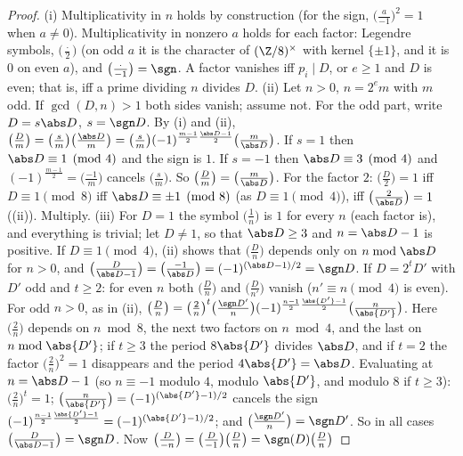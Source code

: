 \begin{proof}
(i) Multiplicativity in $n$ holds by construction (for the sign, $\bigl(\frac a{-1}\bigr)^2=1$ when $a\ne0$). Multiplicativity in nonzero $a$ holds for each factor:
Legendre symbols, $\bigl(\frac\cdot2\bigr)$ (on odd $a$ it is the character of $(\Z/8)^\times$ with kernel $\{\pm1\}$, and it is $0$ on even $a$), and $\bigl(\frac\cdot{-1}\bigr)=\sgn$. A
factor vanishes iff $p_i\mid D$, or $e\ge1$ and $D$ is even; that is, iff a prime dividing $n$ divides $D$.
(ii) Let $n>0$, $n=2^em$ with $m$ odd. If $\gcd(D,n)>1$ both sides vanish; assume not. For the odd part, write $D=s\abs D$, $s=\sgn D$. By (i) and
(ii), $\bigl(\frac Dm\bigr)=\bigl(\frac sm\bigr)\bigl(\frac{\abs D}m\bigr)=\bigl(\frac sm\bigr)(-1)^{\frac{m-1}2\frac{\abs D-1}2}\bigl(\frac m{\abs D}\bigr)$. If $s=1$ then $\abs D\equiv1\pmod4$ and the sign is $1$. If $s=-1$
then $\abs D\equiv3\pmod4$ and $(-1)^{\frac{m-1}2}=\bigl(\frac{-1}m\bigr)$ cancels $\bigl(\frac sm\bigr)$. So $\bigl(\frac Dm\bigr)=\bigl(\frac m{\abs D}\bigr)$. For the factor $2$:
$\bigl(\frac D2\bigr)=1$ iff $D\equiv1\pmod8$ iff $\abs D\equiv\pm1\pmod8$ (as $D\equiv1\pmod4$), iff $\bigl(\frac2{\abs D}\bigr)=1$ ((ii)). Multiply.
(iii) For $D=1$ the symbol $\bigl(\frac1n\bigr)$ is $1$ for every $n$ (each factor is), and everything is trivial; let $D\ne1$, so that $\abs D\ge3$
and $n=\abs D-1$ is positive. If $D\equiv1\pmod4$, (ii) shows that $\bigl(\frac Dn\bigr)$ depends only on $n\bmod\abs D$ for $n>0$, and $\bigl(\frac D{\abs D-1}\bigr)=\bigl(\frac{-1}{\abs D}\bigr)=(-1)^{(\abs D-1)/2}=\sgn D$. If $D=2^tD'$ with $D'$
odd and $t\ge2$: for even $n$ both $\bigl(\frac Dn\bigr)$ and $\bigl(\frac D{n'}\bigr)$ vanish ($n'\equiv n\pmod4$ is even). For odd $n>0$, as in (ii),
$\bigl(\frac Dn\bigr)=\bigl(\frac2n\bigr)^t\bigl(\frac{\sgn D'}n\bigr)(-1)^{\frac{n-1}2\frac{\abs{D'}-1}2}\bigl(\frac n{\abs{D'}}\bigr)$. Here $\bigl(\frac2n\bigr)$ depends on $n\bmod8$, the next two factors on $n\bmod4$, and the last on
$n\bmod\abs{D'}$; if $t\ge3$ the period $8\abs{D'}$ divides $\abs D$, and if $t=2$ the factor $\bigl(\frac2n\bigr)^2=1$ disappears and the period $4\abs{D'}=\abs D$. Evaluating at
$n=\abs D-1$ (so $n\equiv-1$ modulo $4$, modulo $\abs{D'}$, and modulo $8$ if $t\ge3$): $\bigl(\frac2n\bigr)^t=1$; $\bigl(\frac n{\abs{D'}}\bigr)=(-1)^{(\abs{D'}-1)/2}$ cancels the sign
$(-1)^{\frac{n-1}2\frac{\abs{D'}-1}2}=(-1)^{(\abs{D'}-1)/2}$; and $\bigl(\frac{\sgn D'}n\bigr)=\sgn D'$. So in all cases $\bigl(\frac D{\abs D-1}\bigr)=\sgn D$. Now $\bigl(\frac D{-n}\bigr)=\bigl(\frac D{-1}\bigr)\bigl(\frac Dn\bigr)=\sgn(D)\bigl(\frac Dn\bigr)$

\end{proof}
